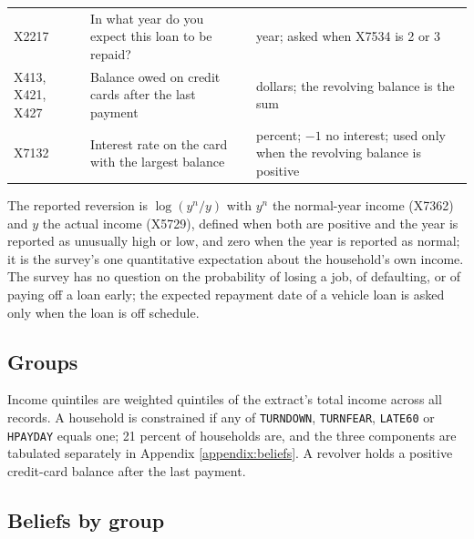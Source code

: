 \begin{table}[H]
\begin{tabular}{p{1.6cm} p{7.6cm} p{5.6cm}}
X2217 & In what year do you expect this loan to be repaid? & year; asked when X7534 is 2 or 3 \\
X413, X421, X427 & Balance owed on credit cards after the last payment & dollars; the revolving balance is the sum \\
X7132 & Interest rate on the card with the largest balance & percent; $-1$ no interest; used only when the revolving balance is positive \\
\bottomrule
\end{tabular}
\end{table}

The reported reversion is $\log(y^{n}/y)$ with $y^{n}$ the normal-year income (X7362) and $y$ the actual income (X5729), defined when both are positive and the year is reported as unusually high or low, and zero when the year is reported as normal; it is the survey's one quantitative expectation about the household's own income. The survey has no question on the probability of losing a job, of defaulting, or of paying off a loan early; the expected repayment date of a vehicle loan is asked only when the loan is off schedule.

\subsection{Groups}

Income quintiles are weighted quintiles of the extract's total income across all records. A household is constrained if any of \texttt{TURNDOWN}, \texttt{TURNFEAR}, \texttt{LATE60} or \texttt{HPAYDAY} equals one; 21 percent of households are, and the three components are tabulated separately in Appendix \ref{appendix:beliefs}. A revolver holds a positive credit-card balance after the last payment.

\subsection{Beliefs by group}

